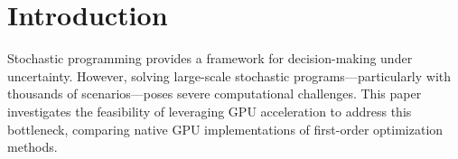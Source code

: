 \section{Introduction}
Stochastic programming provides a framework for decision-making under uncertainty. However, solving large-scale stochastic programs—particularly with thousands of scenarios—poses severe computational challenges. This paper investigates the feasibility of leveraging GPU acceleration to address this bottleneck, comparing native GPU implementations of first-order optimization methods.